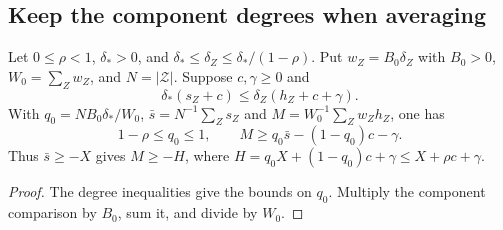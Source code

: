
































\subsection{Keep the component degrees when averaging}

\begin{lemma}
\label{rh-degree-weights}
Let $0\le\rho<1$, $\delta_*>0$, and
$\delta_*\le\delta_Z\le\delta_* /(1-\rho)$.
Put $w_Z=B_0\delta_Z$ with $B_0>0$, $W_0=\sum_Zw_Z$, and
$N=|\mathcal Z|$. Suppose $c,\gamma\ge0$ and
\[
 \delta_*(s_Z+c)\le\delta_Z(h_Z+c+\gamma).
\]
With $q_0=NB_0\delta_*/W_0$, $\bar s=N^{-1}\sum_Zs_Z$ and
$M=W_0^{-1}\sum_Zw_Zh_Z$, one has
\begin{equation}\label{rh-degree-weights-result}
 1-\rho\le q_0\le1,\qquad
 M\ge q_0\bar s-(1-q_0)c-\gamma.
\end{equation}
Thus $\bar s\ge-X$ gives $M\ge-H$, where
$H=q_0X+(1-q_0)c+\gamma\le X+\rho c+\gamma$.
\end{lemma}

\begin{proof}
The degree inequalities give the bounds on $q_0$. Multiply the
component comparison by $B_0$, sum it, and divide by $W_0$.
\end{proof}

